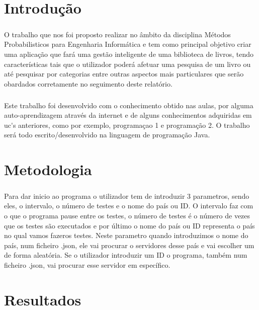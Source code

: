 \documentclass{report}
\begin{document}
\chapter{Introdução}
\label{chap.introducao}
\paragraph{} 
O trabalho que nos foi proposto realizar no âmbito da disciplina Métodos Probabilisticos para Engenharia Informática e tem como principal objetivo criar uma aplicação que fará uma gestão inteligente de uma biblioteca de livros, tendo características tais que o utilizador poderá afetuar uma pesquisa de um livro ou até pesquisar por categorias entre outras aspectos mais particulares que serão obardados corretamente no seguimento deste relatório.  
\paragraph{}
Este trabalho foi desenvolvido com o conhecimento obtido nas aulas, por alguma auto-aprendizagem através da internet  e de alguns conhecimentos adquiridas em \acs{uc's} anteriores, como por exemplo, programaçao 1 e programação 2. O trabalho será todo escrito/desenvolvido na linguagem de programação Java.

\chapter{Metodologia}
\label{chap.metodologia}
\paragraph{}
Para dar inicio ao programa o utilizador tem de introduzir 3 parametros, sendo eles, o intervalo, o número de testes e o nome do país ou ID. O intervalo faz com o que o programa pause entre os testes, o número de testes é o número de vezes que os testes são executados e por último o nome do país ou ID representa o país no qual vamos fazeros testes. Neste parametro quando introduzimos o nome do país, num ficheiro .json, ele vai procurar o servidores desse país e vai escolher um de forma aleatória. Se o utilizador introduzir um ID o programa, também num ficheiro .json, vai procurar esse servidor em específico.

\chapter{Resultados}
\label{chap.resultados}
\end{document}
